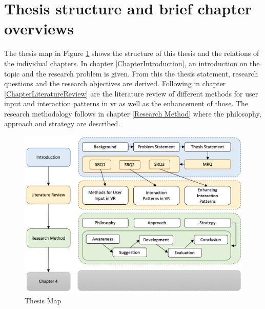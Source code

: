 \section{Thesis structure and brief chapter overviews}

The thesis map in Figure \ref{fig:thesismap} shows the structure of this thesis and the relations of the individual chapters. \newline
In chapter \ref{ChapterIntroduction}, an introduction on the topic and the research problem is given. From this the thesis statement, research questions and the research objectives are derived. Following in chapter \ref{ChapterLiteratureReview} are the literature review of different methods for user input and interaction patterns in \gls{vr} as well as the enhancement of those. The research methodology follows in chapter \ref{Research Method} where the philosophy, approach and strategy are described. \newline
\begin{figure}[pt]
	\begin{center}
		\includegraphics[width=14cm]{03_Figures/06_Introduction/ThesisMap.png}
		\caption{Thesis Map}
		\label{fig:thesismap}
	\end{center}
\end{figure}






